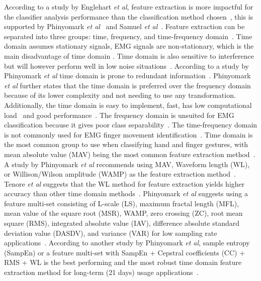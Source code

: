 According to a study by Englehart \textit{et al}, feature extraction is more impactful for the classifier analysis performance than the classification method chosen~\cite{englehartClassificationMyoelectricSignal1999}\cite{schemeElectromyogramPatternRecognition2011}, this is supported by Phinyomark \textit{et al}~\cite{phinyomarkFeatureExtractionSelection2018} and Samuel \textit{et al}~\cite{samuelPatternRecognitionElectromyography2018}.
Feature extraction can be separated into three groups: time, frequency, and time-frequency domain~\cite{phinyomarkFeatureReductionSelection2012}\cite{nazmiReviewClassificationTechniques2016}\cite{khanSelectionFeaturesClassifiers2020}\cite{millarLSTMNetworkClassification2022}. Time domain assumes stationary signals, EMG signals are non-stationary, which is the main disadvantage of time domain \cite{phinyomarkFeatureReductionSelection2012}. Time domain is also sensitive to interference but will however perform well in low noise situations~\cite{phinyomarkFeatureReductionSelection2012}. According to a study by Phinyomark \textit{et al} time domain is prone to redundant information~\cite{phinyomarkFeatureReductionSelection2012}. Phinyomark \textit{et al} further states that the time domain is preferred over the frequency domain because of its lower complexity and not needing to use any transformation. Additionally, the time domain is easy to implement, fast, has low computational load~\cite{sultanaSystematicReviewSurface2023} and good performance~\cite{millarLSTMNetworkClassification2022}.  
The frequency domain is unsuited for EMG classification because it gives poor class separability~\cite{phinyomarkFeatureReductionSelection2012}\cite{khanSelectionFeaturesClassifiers2020}. The time-frequency domain is not commonly used for EMG finger movement identification~\cite{sultanaSystematicReviewSurface2023}.
Time domain is the most common group to use when classifying hand and finger gestures, with mean absolute value (MAV) being the most common feature extraction method~\cite{sultanaSystematicReviewSurface2023}. 
A study by Phinyomark \textit{et al} recommends using MAV, Waveform length (WL), or Willison/Wilson amplitude (WAMP) as the feature extraction method~\cite{phinyomarkFeatureReductionSelection2012}. Tenore \textit{et al} suggests that the WL method for feature extraction yields higher accuracy than other time domain methods~\cite{tenoreDecodingIndividuatedFinger2009}. Phinyomark \textit{et al} suggests using a feature multi-set consisting of L-scale (LS), maximum fractal length (MFL), mean value of the square root (MSR), WAMP, zero crossing (ZC), root mean square (RMS), integrated absolute value (IAV), difference absolute standard deviation value (DASDV), and variance (VAR) for low sampling rate applications~\cite{phinyomarkFeatureExtractionSelection2018}. According to another study by Phinyomark \textit{et al}, sample entropy (SampEn) or a feature multi-set with SampEn + Cepstral coefficients (CC) + RMS + WL is the best performing and the most robust time domain feature extraction method for long-term (21 days) usage applications~\cite{phinyomarkEMGFeatureEvaluation2013}.
